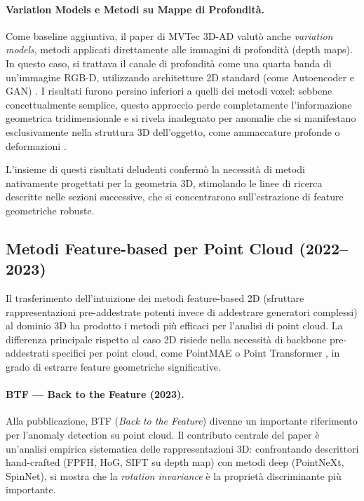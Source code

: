 \paragraph{Variation Models e Metodi su Mappe di Profondità.}
Come baseline aggiuntiva, il paper di MVTec 3D-AD valutò anche \textit{variation models}, metodi applicati direttamente alle immagini di profondità (depth maps). In questo caso, si trattava il canale di profondità come una quarta banda di un'immagine RGB-D, utilizzando architetture 2D standard (come Autoencoder e GAN) \cite{bergmann2021mvtec3d}. I risultati furono persino inferiori a quelli dei metodi voxel: sebbene concettualmente semplice, questo approccio perde completamente l'informazione geometrica tridimensionale e si rivela inadeguato per anomalie che si manifestano esclusivamente nella struttura 3D dell'oggetto, come ammaccature profonde o deformazioni \cite{bergmann2021mvtec3d}.

L'insieme di questi risultati deludenti confermò la necessità di metodi nativamente progettati per la geometria 3D, stimolando le linee di ricerca descritte nelle sezioni successive, che si concentrarono sull'estrazione di feature geometriche robuste.

\subsection{Metodi Feature-based per Point Cloud (2022--2023)}
\label{subsec:metodi-3d-pointcloud}

Il trasferimento dell'intuizione dei metodi feature-based 2D (sfruttare rappresentazioni pre-addestrate potenti invece di addestrare generatori complessi) al dominio 3D ha prodotto i metodi più efficaci per l'analisi di point cloud. La differenza principale rispetto al caso 2D risiede nella necessità di backbone pre-addestrati specifici per point cloud, come PointMAE \cite{pang2022masked} o Point Transformer \cite{zhao2021point}, in grado di estrarre feature geometriche significative.


\paragraph{BTF --- Back to the Feature (2023).}
Alla pubblicazione, BTF (\textit{Back to the Feature}) \cite{horwitz2023back} divenne un importante riferimento per l'anomaly detection su point cloud. Il contributo centrale del paper è un'analisi empirica sistematica delle rappresentazioni 3D: confrontando descrittori hand-crafted (FPFH, HoG, SIFT su depth map) con metodi deep (PointNeXt, SpinNet), si mostra che la \textit{rotation invariance} è la proprietà discriminante più importante. 

